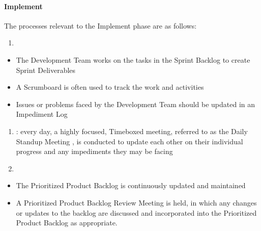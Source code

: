 \documentclass[letterpaper,10pt,english]{jupyterBook}
\begin{document}
\paragraph{Implement}
\label{\detokenize{APM/sbok:implement}}
\sphinxAtStartPar
The processes relevant to the Implement phase are as follows:
\begin{enumerate}
%
\item {} 
\sphinxAtStartPar
{}

\end{enumerate}
\begin{itemize}
\item {} 
\sphinxAtStartPar
The Development Team works on the tasks in the Sprint Backlog to create Sprint Deliverables

\item {} 
\sphinxAtStartPar
A Scrumboard is often used to track the work and activities

\item {} 
\sphinxAtStartPar
Issues or problems faced by the Development Team should be updated in an Impediment Log

\end{itemize}
\begin{enumerate}
%
\setcounter{enumi}{1}
\item {} 
\sphinxAtStartPar
{}: every day, a highly focused, Time\sphinxhyphen{}boxed meeting, referred to as the Daily Standup Meeting , is conducted to update each other on their individual progress and any impediments they may be facing

\item {} 
\sphinxAtStartPar
{}

\end{enumerate}
\begin{itemize}
\item {} 
\sphinxAtStartPar
The Prioritized Product Backlog is continuously updated and maintained

\item {} 
\sphinxAtStartPar
A Prioritized Product Backlog Review Meeting is held, in which any changes or updates to the backlog are discussed and incorporated into the Prioritized Product Backlog as appropriate.

\end{itemize}
\end{document}
